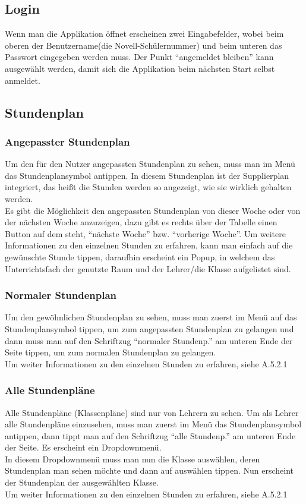 \subsection{Login}
Wenn man die Applikation öffnet erscheinen zwei Eingabefelder, wobei beim oberen der Benutzername(die Novell-Schülernummer) und beim unteren das Passwort eingegeben werden muss. Der Punkt \enquote{angemeldet bleiben} kann ausgewählt werden, damit sich die Applikation beim nächsten Start selbst anmeldet. 

\subsection{Stundenplan}
\subsubsection{Angepasster Stundenplan}
Um den für den Nutzer angepassten Stundenplan zu sehen, muss man im Menü das Stundenplansymbol antippen. In diesem Stundenplan ist der Supplierplan integriert, das heißt die Stunden werden so angezeigt, wie sie wirklich gehalten werden.\\
Es gibt die Möglichkeit den angepassten Stundenplan von dieser Woche oder von der nächsten Woche anzuzeigen, dazu gibt es rechts über der Tabelle einen Button auf dem steht, \enquote{nächste Woche} bzw. \enquote{vorherige Woche}.
Um weitere Informationen zu den einzelnen Stunden zu erfahren, kann man einfach auf die gewünschte Stunde tippen, daraufhin erscheint ein Popup, in welchem das Unterrichtsfach der genutzte Raum und der Lehrer/die Klasse aufgelistet sind.

\subsubsection{Normaler Stundenplan}
Um den gewöhnlichen Stundenplan zu sehen, muss man zuerst im Menü auf das Stundenplansymbol tippen, um zum angepassten Stundenplan zu gelangen und dann muss man auf den Schriftzug \enquote{normaler Stundenp.} am unteren Ende der Seite tippen, um zum normalen Stundenplan zu gelangen.\\
Um weiter Informationen zu den einzelnen Stunden zu erfahren, siehe A.5.2.1

\subsubsection{Alle Stundenpläne}
Alle Stundenpläne (Klassenpläne) sind nur von Lehrern zu sehen. Um als Lehrer alle Stundenpläne einzusehen, muss man zuerst im Menü das Stundenplansymbol antippen, dann tippt man auf den Schriftzug \enquote{alle Stundenp.} am unteren Ende der Seite. Es erscheint ein Dropdownmenü.\\
In diesem Dropdownmenü muss man nun die Klasse auswählen, deren Stundenplan man sehen möchte und dann auf auswählen tippen. Nun erscheint der Stundenplan der ausgewählten Klasse.\\
Um weiter Informationen zu den einzelnen Stunden zu erfahren, siehe A.5.2.1

